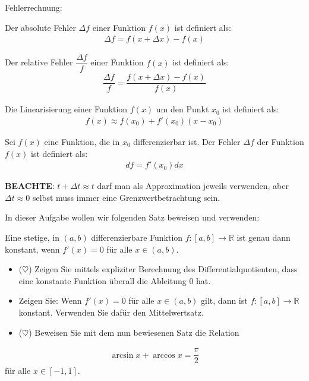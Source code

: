 \documentclass[12pt]{article}
\newcommand{\R}{\mathbb{R}} %
\newenvironment{definition}[2][Definition]{\begin{trivlist}
        \item[\hskip \labelsep {\bfseries #1}\hskip \labelsep {\bfseries #2.}]}{\flushright{$\square$}\end{trivlist}}
\newenvironment{lemma}[2][Theorem]{\begin{trivlist}
        \item[\hskip \labelsep {\bfseries #1}\hskip \labelsep {\bfseries #2.}]}{\flushright{$\square$}\end{trivlist}}
\newenvironment{problem}[2][\textcolor{blue}{Tipps \& Tricks zu}]{\begin{trivlist}
        \item[\hskip \labelsep {\bfseries #1}\hskip \labelsep {\bfseries \textcolor{blue}{#2}.}]}{\end{trivlist}}
\newenvironment{question}[2][\textcolor{red}{Aufgabe}]{\begin{trivlist}
        \item[\hskip \labelsep {\bfseries \textcolor{red}{#1}}\hskip \labelsep {\bfseries \textcolor{red}{#2}.}]}{\end{trivlist}}
\begin{document}
\begin{problem}{3} Fehlerrechnung:
\begin{definition}{[Absoluter Fehler]}
    Der absolute Fehler $\Delta{f}$ einer Funktion $f(x)$ ist definiert als:
    \begin{align*}
        \Delta{f}=f(x+\Delta{x})-f(x)
    \end{align*}
\end{definition}
\begin{definition}{[Relativer Fehler]}
    Der relative Fehler $\dfrac{\Delta{f}}{f}$ einer Funktion $f(x)$ ist definiert als:
    \begin{align*}
        \dfrac{\Delta{f}}{f}=\dfrac{f(x+\Delta{x})-f(x)}{f(x)}
    \end{align*}
\end{definition}
\begin{definition}{[Linearisierung]}
    Die Linearisierung einer Funktion $f(x)$ um den Punkt $x_0$ ist definiert als:
    \begin{align*}
        f(x)\approx f(x_0)+f'(x_0)(x-x_0)
    \end{align*}
\end{definition}
\begin{definition}{[Linearisierter Fehler]}
    Sei $f(x)$ eine Funktion, die in $x_0$ differenzierbar ist. Der Fehler $\Delta{f}$ der Funktion $f(x)$ ist definiert als:
    \begin{align*}
        d{f}=f'(x_0)d{x}
    \end{align*}
\end{definition}
\textbf{BEACHTE}: $t + \Delta t \approx t$ darf man als Approximation jeweils verwenden, aber $\Delta t \approx 0$ selbst muss immer eine Grenzwertbetrachtung sein.
\end{problem}

\begin{question}{4}
    In dieser Aufgabe wollen wir folgenden Satz beweisen und verwenden:
    \begin{lemma}{[]} Eine stetige, in $(a, b)$ differenzierbare Funktion $f : [a, b] \to \R$ ist genau dann konstant,
        wenn $f'(x) = 0$ für alle $x \in (a, b)$.
    \end{lemma}
    \begin{itemize}
        \item[(a)] ($\heartsuit$) Zeigen Sie mittels expliziter Berechnung des Differentialquotienten, dass eine konstante Funktion überall die Ableitung $0$ hat.
        \item[(b)] Zeigen Sie: Wenn $f'(x) = 0$ für alle $x \in (a, b)$ gilt, dann ist $f : [a, b] \to \R$ konstant.
              Verwenden Sie dafür den Mittelwertsatz.
        \item[(c)] ($\heartsuit$) Beweisen Sie mit dem nun bewiesenen Satz die Relation
    \end{itemize}
    \begin{align*}
        \arcsin x + \arccos x = \dfrac{\pi}{2}
    \end{align*}
    für alle $x \in [-1, 1]$.
\end{question}
\end{document}
